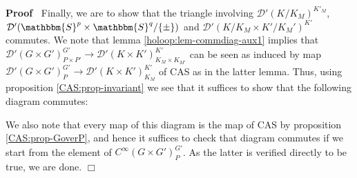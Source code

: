 \documentclass{article}
\newenvironment{proof}{\noindent\textbf{Proof\ }}{\hspace*{\fill}$\Box$\medskip}
\begin{document}
\begin{proof}
  Finally, we are to show that the triangle involving $\mathcal{D}' (K /
  K_M)^{K'_M}$, $\mathcal{D}' (\mathbbm{S}^p \times \mathbbm{S}^q / \{ \pm
  \})$ and $\mathcal{D}' (K / K_M \times K' / K_M')^{K'}$ commutes. We note
  that lemma \ref{holoop:lem-commdiag-aux1} implies that $\mathcal{D}' (G
  \times G')_{P \times P'}^{G'} \rightarrow \mathcal{D}' (K \times K')_{K_M
  \times K_{M'}}^{K'}$ can be seen as induced by map $\mathcal{D}' (G \times
  G')^{G'}_P \rightarrow \mathcal{D}' (K \times K')_{K_M}^{K'}$ of CAS as in
  the latter lemma. Thus, using proposition \ref{CAS:prop-invariant} we see
  that it suffices to show that the following diagram commutes:
  \begin{center}
  \end{center}
  We also note that every map of this diagram is the map of CAS by proposition
  \ref{CAS:prop-GoverP}, and hence it suffices to check that diagram commutes
  if we start from the element of $C^{\infty} (G \times G')^{G'}_P$. As the
  latter is verified directly to be true, we are done.
\end{proof}
\end{document}
